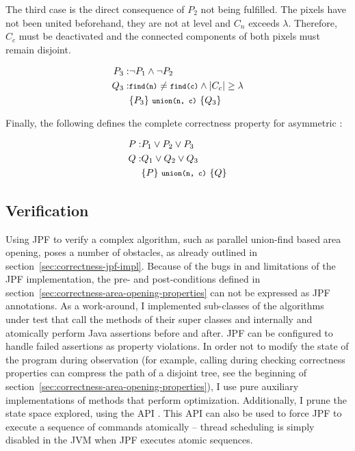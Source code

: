 The third case is the direct consequence of $P_2$ not being fulfilled. The
pixels have not been united beforehand, they are not at level and $C_n$ exceeds
$\lambda$. Therefore, $C_c$ must be deactivated and the connected components of
both pixels must remain disjoint.

\begin{eqnarray}
  P_3: & \neg P_1 \wedge \neg P_2 \\
  Q_3: & {\footnotesize\texttt{find(n)}} \neq {\footnotesize\texttt{find(c)}} \wedge |C_c| \geq \lambda \\
  & \{P_3\} ~ {\footnotesize\texttt{union(n, c)}} ~ \{Q_3\}
  \label{eq:correctness-area-opening-properties-uf-3}
\end{eqnarray}

Finally, the following defines the complete correctness property for asymmetric
:

\begin{eqnarray}
  \label{eq:correctness-area-opening-properties-uf}
  P: & P_1 \vee P_2 \vee P_3 \\
  Q: & Q_1 \vee Q_2 \vee Q_3 \\
  & \{P\} ~ {\footnotesize\texttt{union(n, c)}} ~ \{Q\}
\end{eqnarray}

\subsection{Verification}
\label{sec:correctness-area-opening-verification}

Using JPF to verify a complex algorithm, such as parallel union-find based area
opening, poses a number of obstacles, as already outlined in
section~\ref{sec:correctness-jpf-impl}. Because of the bugs in and limitations
of the JPF implementation, the pre- and post-conditions defined in
section~\ref{sec:correctness-area-opening-properties} can not be expressed as
JPF annotations. As a work-around, I implemented sub-classes of the algorithms
under test that call the methods of their super classes and internally and
atomically perform Java assertions before and after. JPF can be configured to
handle failed assertions as property violations. In order not to modify the
state of the program during observation (for example, calling 
during checking correctness properties can compress the path of a disjoint tree,
see the beginning of section~\ref{sec:correctness-area-opening-properties}), I
use pure auxiliary implementations of methods that perform
optimization. Additionally, I prune the state space explored, using the
 API \cite{Visser2003Model}. This API can also be used to
force JPF to execute a sequence of commands atomically -- thread scheduling is
simply disabled in the JVM when JPF executes atomic sequences.

